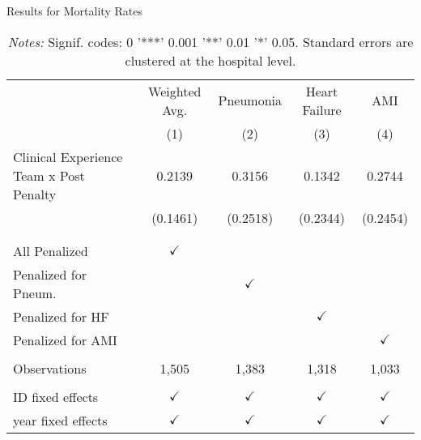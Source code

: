 \begin{table}[ht!]
\caption{Results for Mortality Rates}
\begin{tabular}{lcccc}
\toprule
 & Weighted Avg. & Pneumonia & Heart Failure & AMI\\
 & (1) & (2) & (3) & (4)\\
\midrule Clinical Experience Team x Post Penalty & 0.2139 & 0.3156 & 0.1342 & 0.2744\\
  & (0.1461) & (0.2518) & (0.2344) & (0.2454)\\
  \\
  \\
All Penalized & $\checkmark$ &  &  & \\
Penalized for Pneum. &  & $\checkmark$ &  & \\
Penalized for HF &  &  & $\checkmark$ & \\
Penalized for AMI &  &  &  & $\checkmark$\\
  &   &   &   &  \\
Observations & 1,505 & 1,383 & 1,318 & 1,033\\
  &   &   &   &  \\
ID fixed effects & $\checkmark$ & $\checkmark$ & $\checkmark$ & $\checkmark$\\
year fixed effects & $\checkmark$ & $\checkmark$ & $\checkmark$ & $\checkmark$\\
\bottomrule
\end{tabular}
\caption*{\footnotesize{\textit{Notes:} Signif. codes:  0 '***' 0.001 '**' 0.01 '*' 0.05. Standard errors are clustered at the hospital level.}}
\end{table}